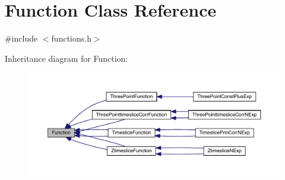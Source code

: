 \hypertarget{classFunction}{}\section{Function Class Reference}
\label{classFunction}


{\ttfamily \#include $<$functions.\+h$>$}



Inheritance diagram for Function\+:
\nopagebreak
\begin{figure}[H]
\begin{center}
\leavevmode
\includegraphics[width=350pt]{d9/d8d/classFunction__inherit__graph}
\end{center}
\end{figure}
